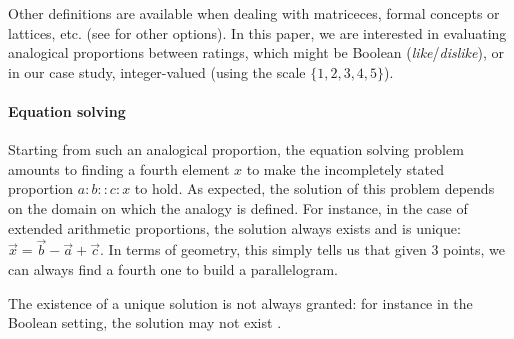 \documentclass{llncs}
\begin{document}
Other definitions are available when dealing with matriceces, formal concepts or lattices, etc. (see \cite{StroppaYvon2006,LepageHDR2003} for other options). In this paper, we are interested in evaluating analogical proportions between ratings, which might be Boolean (\textit{like}/\textit{dislike}), or in our case study, integer-valued (using the scale $\{1, 2, 3, 4, 5\}$). 

\paragraph{Equation solving\\}
Starting from such an analogical proportion, the equation solving problem
amounts to finding a fourth element $x$ to make the incompletely stated proportion $a:b::c:x$ to hold.  
As expected, the solution of this problem depends on the domain on which the
analogy is defined. For instance, in
the case of extended arithmetic proportions, the solution always exists and is unique:
$\vec{x}= \vec{b}-\vec{a} +
\vec{c}$. In terms of geometry, this simply tells us that given 3 points, we can always find a fourth one  to build a parallelogram. 

The existence of a unique solution is not always granted: for instance in the
Boolean setting, the solution may not exist \cite{MicPraECSQARU2009}.

\end{document}
